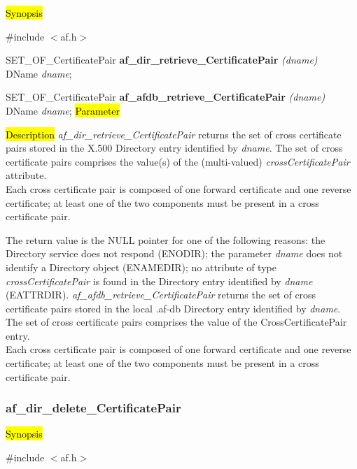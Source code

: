 \hl{Synopsis}

\#include $<$af.h$>$ 

SET\_OF\_CertificatePair {\bf *af\_dir\_retrieve\_CertificatePair} {\em (dname)} \\
DName {\em *dname};

SET\_OF\_CertificatePair {\bf *af\_afdb\_retrieve\_CertificatePair} {\em (dname)} \\
DName {\em *dname};
\hl{Parameter}

\hl{Description}
{\em af\_dir\_retrieve\_CertificatePair} returns the set of cross certificate pairs 
stored in the X.500 Directory entry identified by {\em dname}. The set of cross certificate pairs 
comprises the value(s) of the (multi-valued) {\em crossCertificatePair} attribute. \\
Each cross certificate pair is composed of one forward certificate and one reverse certificate;
at least one of the two components must be present in a cross certificate pair.

The return value is the NULL pointer for one of the following reasons:
\bi
\m the Directory service does not respond (ENODIR);
\m the parameter {\em dname} does not identify a Directory object (ENAMEDIR);
\m no attribute of type {\em crossCertificatePair} is found in the Directory entry
identified by {\em dname} (EATTRDIR).
\ei
{\em af\_afdb\_retrieve\_CertificatePair} returns the set of cross certificate pairs 
stored in the local .af-db Directory entry identified by {\em dname}. 
The set of cross certificate pairs 
comprises the value of the CrossCertificatePair entry. \\
Each cross certificate pair is composed of one forward certificate and one reverse certificate;
at least one of the two components must be present in a cross certificate pair.



\subsubsection{af\_dir\_delete\_CertificatePair}

\hl{Synopsis}

\#include $<$af.h$>$


